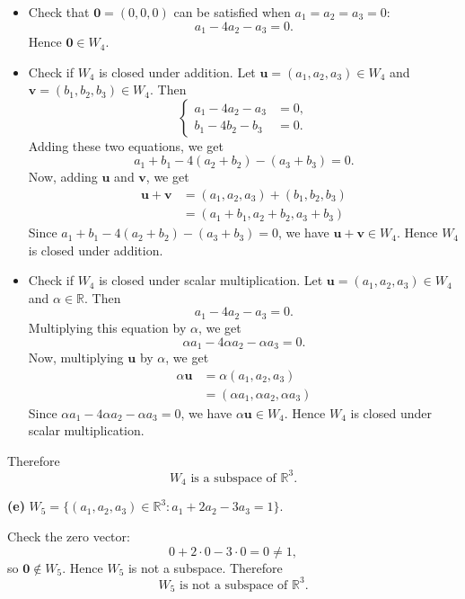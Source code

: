 \documentclass{article}
\begin{document}
\begin{itemize}
\item Check that $\mathbf{0} = (0,0,0)$ can be satisfied when $a_1 = a_2 = a_3 = 0$:
\[
a_1 - 4a_2 - a_3 = 0.
\]
Hence $\mathbf{0} \in W_4$.

\item Check if $W_4$ is closed under addition. Let $\mathbf{u} = (a_1,a_2,a_3) \in W_4$ and $\mathbf{v} = (b_1,b_2,b_3) \in W_4$. Then
\[
\left\{\begin{aligned}
a_1 - 4a_2 - a_3 &= 0, \\
b_1 - 4b_2 - b_3 &= 0.
\end{aligned}\right.
\]
Adding these two equations, we get
\[
a_1 + b_1 - 4(a_2 + b_2) - (a_3 + b_3) = 0.
\]
Now, adding $\mathbf{u}$ and $\mathbf{v}$, we get
\begin{align*}
\mathbf{u} + \mathbf{v} &= (a_1, a_2, a_3) + (b_1, b_2, b_3) \\
&= (a_1 + b_1, a_2 + b_2, a_3 + b_3)
\end{align*}
Since $a_1 + b_1 - 4(a_2 + b_2) - (a_3 + b_3) = 0$, we have $\mathbf{u} + \mathbf{v} \in W_4$. Hence $W_4$ is closed under addition.

\item Check if $W_4$ is closed under scalar multiplication. Let $\mathbf{u} = (a_1,a_2,a_3) \in W_4$ and $\alpha \in \mathbb{R}$. Then
\[
a_1 - 4a_2 - a_3 = 0.
\]
Multiplying this equation by $\alpha$, we get
\[
\alpha a_1 - 4\alpha a_2 - \alpha a_3 = 0.
\]
Now, multiplying $\mathbf{u}$ by $\alpha$, we get
\begin{align*}
\alpha \mathbf{u} &= \alpha (a_1, a_2, a_3) \\
&= (\alpha a_1, \alpha a_2, \alpha a_3)
\end{align*}
Since $\alpha a_1 - 4\alpha a_2 - \alpha a_3 = 0$, we have $\alpha \mathbf{u} \in W_4$. Hence $W_4$ is closed under scalar multiplication.
\end{itemize}

Therefore
\[
\boxed{W_4 \text{ is a subspace of } \mathbb{R}^3.}
\]

\bigskip

\noindent
\textbf{(e)} $W_5 = \{(a_1,a_2,a_3) \in \mathbb{R}^3 : a_1 + 2a_2 - 3a_3 = 1\}$.

Check the zero vector:
\[
0 + 2\cdot0 - 3\cdot0 = 0 \neq 1,
\]
so $\mathbf{0}\notin W_5$. Hence $W_5$ is not a subspace. Therefore
\[
\boxed{W_5 \text{ is not a subspace of } \mathbb{R}^3.}
\]

\bigskip
\end{document}
